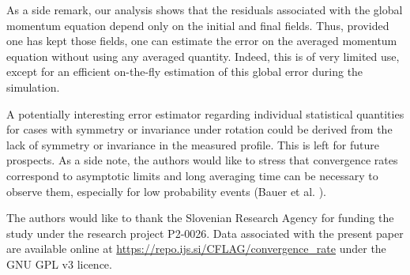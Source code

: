 \documentclass[aip,pof,reprint]{revtex4-1}
\begin{document}
As a side remark, our analysis shows that the residuals associated with the global momentum equation depend only on the initial and final fields.
Thus, provided one has kept those fields, one can estimate the error on the averaged momentum equation without using any averaged quantity.
Indeed, this is of very limited use, except for an efficient on-the-fly estimation of this global error during the simulation.

A potentially interesting error estimator regarding individual statistical quantities for cases with symmetry or invariance under rotation could be derived from the lack of symmetry or invariance in the measured profile.
This is left for future prospects.
{\color{red} As a side note, the authors would like to stress that convergence rates correspond to asymptotic limits and long averaging time can be necessary to observe them, especially for low probability events (Bauer et al. \citep{bauer2017convergence}).}

The authors would like to thank the Slovenian Research Agency for funding the study under the research project P2-0026.
{\color{red}Data associated with the present paper are available online at \url{https://repo.ijs.si/CFLAG/convergence_rate} under the GNU GPL v3 licence.}

%

%

%


\end{document}

